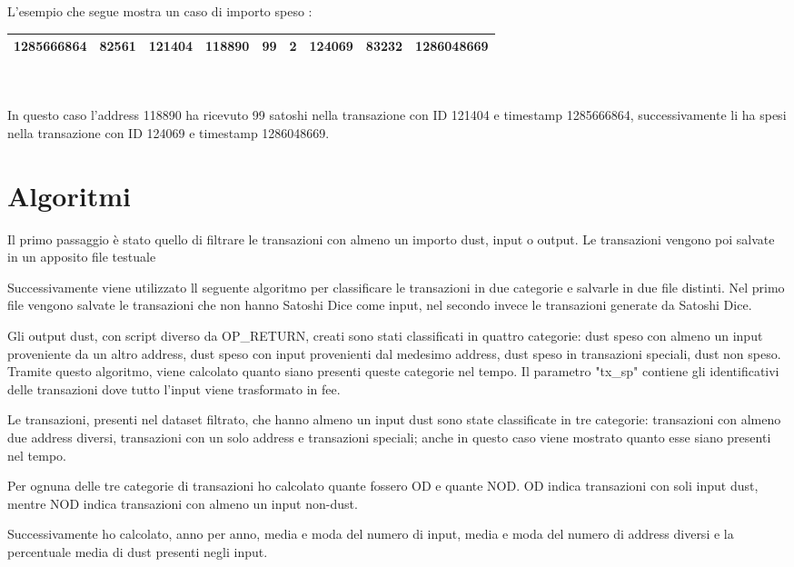 L'esempio che segue mostra un caso di importo speso :\\
\begin{tabular}{|l|l|l|l|l|l|l|l|l|}
\toprule
1285666864 &    82561 & 121404 &  118890 &      99 &           2 &       124069 &       83232 &      1286048669\\
\bottomrule
\end{tabular}\\\\
In questo caso l'address 118890 ha ricevuto 99 satoshi nella transazione con ID 121404 e timestamp 1285666864, successivamente li ha spesi nella transazione con ID 124069 e timestamp 1286048669.\\
\section{Algoritmi}
Il primo passaggio è stato quello di filtrare le transazioni con almeno un importo dust, input o output. Le transazioni vengono poi salvate in un apposito file testuale  

Successivamente viene utilizzato ll seguente algoritmo per classificare le transazioni in due categorie e salvarle in due file distinti.
Nel primo file vengono salvate le transazioni che non hanno Satoshi Dice come input, nel secondo invece le transazioni generate da Satoshi Dice.

Gli output dust, con script diverso da OP\_RETURN, creati sono stati classificati in quattro categorie: dust speso con almeno un input proveniente da un altro address, dust speso con input provenienti dal medesimo address, dust speso in transazioni speciali, dust non speso. Tramite questo algoritmo, viene calcolato quanto siano presenti queste categorie nel tempo. Il parametro "tx\_sp" contiene gli identificativi delle transazioni dove tutto l'input viene trasformato in fee.

Le transazioni, presenti nel dataset filtrato, che hanno almeno un input dust sono state classificate in tre categorie: transazioni con almeno due address diversi, transazioni con un solo address e transazioni speciali; anche in questo caso viene mostrato quanto esse siano presenti nel tempo.

Per ognuna delle tre categorie di transazioni ho calcolato quante fossero OD e quante NOD. OD indica transazioni con soli input dust, mentre NOD indica transazioni con almeno un input non-dust.

Successivamente ho calcolato, anno per anno, media e moda del numero di input, media e moda del numero di address diversi e la percentuale media di dust presenti negli input.
